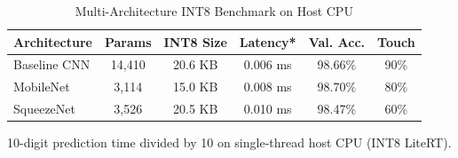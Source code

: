 \begin{table}[t]
\centering
\scriptsize
\setlength{\tabcolsep}{2.8pt}
\renewcommand{\arraystretch}{0.88}
\caption{Multi-Architecture INT8 Benchmark on Host CPU}
\label{tab:architectures}
\begin{tabular}{lccccc}
\toprule
\textbf{Architecture} & \textbf{Params} & \textbf{INT8 Size} & \textbf{Latency*} & \textbf{Val. Acc.} & \textbf{Touch} \\
\midrule
Baseline CNN & 14,410 & 20.6 KB & 0.006 ms & 98.66\% & 90\% \\
MobileNet & 3,114 & 15.0 KB & 0.008 ms & 98.70\% & 80\% \\
SqueezeNet & 3,526 & 20.5 KB & 0.010 ms & 98.47\% & 60\% \\
\bottomrule
\end{tabular}\par
\vspace{2pt}
{\raggedright \tiny *10-digit prediction time divided by 10 on single-thread host CPU (INT8 LiteRT).\par}
\end{table}